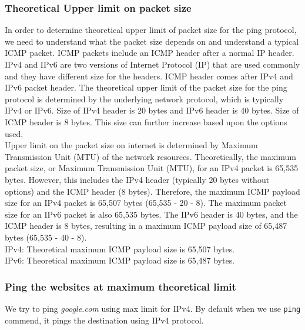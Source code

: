 \documentclass{article}
\begin{document}
\subsubsection{Theoretical Upper limit on packet size}
\normalsize
\noindent
In order to determine theoretical upper limit of packet size for the ping protocol, we need to understand what the packet size depends on and understand a typical ICMP packet. ICMP packets include an ICMP header after a normal IP header. IPv4 and IPv6 are two versions of Internet Protocol (IP) that are used commonly and they have different size for the headers. ICMP header comes after IPv4 and IPv6 packet header. The theoretical upper limit of the packet size for the ping protocol is determined by the underlying network protocol, which is typically IPv4 or IPv6. Size of IPv4 header is 20 bytes and IPv6 header is 40 bytes. Size of ICMP header is 8 bytes. This size can further increase based upon the options used.\\

\noindent
Upper limit on the packet size on internet is determined by Maximum Transmission Unit (MTU) of the network resources. Theoretically, the maximum packet size, or Maximum Transmission Unit (MTU), for an IPv4 packet is 65,535 bytes. However, this includes the IPv4 header (typically 20 bytes without options) and the ICMP header (8 bytes). Therefore, the maximum ICMP payload size for an IPv4 packet is 65,507 bytes (65,535 - 20 - 8). The maximum packet size for an IPv6 packet is also 65,535 bytes. The IPv6 header is 40 bytes, and the ICMP header is 8 bytes, resulting in a maximum ICMP payload size of 65,487 bytes (65,535 - 40 - 8).\\
\textbullet{} IPv4: Theoretical maximum ICMP payload size is 65,507 bytes.\\
\textbullet{} IPv6: Theoretical maximum ICMP payload size is 65,487 bytes.

\subsubsection{Ping the websites at maximum theoretical limit}

\noindent
We try to ping \textit{google.com} using max limit for IPv4. By default when we use \verb|ping| commend, it pings the destination using IPv4 protocol.\\
\end{document}
